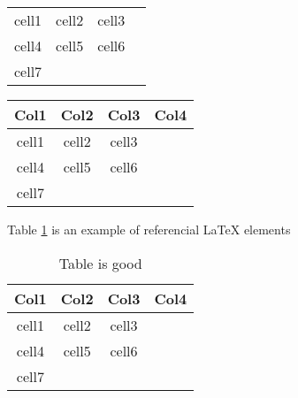 \documentclass{report}
\begin{document}
\begin{center}
	\begin{tabular}{||ccc|c|}
		\hline
		cell1 & cell2 & cell3 \\
		cell4 & cell5 & cell6 \\
		cell7 & & &\\
		\hline %
	\end{tabular}
\end{center}

\begin{center}
	\begin{tabular}{||ccc|c|}
		\hline
		Col1 & Col2 & Col3 & Col4 \\ [1ex]
		\hline
		\hline
		cell1 & cell2 & cell3 \\ [1ex]
		cell4 & cell5 & cell6 \\
		cell7 & & &\\
		\hline %
	\end{tabular}
\end{center}

Table \ref{table:data} is an example of referencial \LaTeX{} elements

\begin{table}[h!]
\centering
\begin{tabular}{||c|c|c|c|}
	\hline
	Col1 & Col2 & Col3 & Col4 \\ [0.5ex]
	\hline
	\hline
	cell1 & cell2 & cell3 & \\
	cell4 & cell5 & cell6 & \\
	cell7 & & &\\
	\hline %
\end{tabular}
\caption{Table is good}
\label{table:data}
\end{table}
\end{document}

